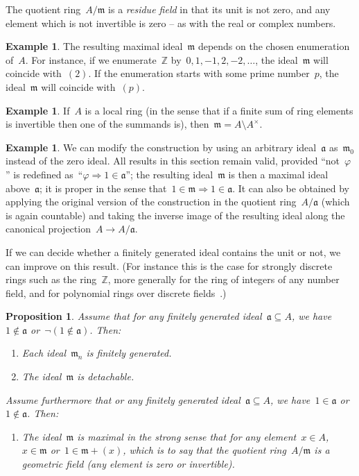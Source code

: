 \documentclass[oneside,reqno]{amsart}
\theoremstyle{definition}
\newtheorem{ex}[defn]{Example}
\theoremstyle{plain}
\newtheorem{prop}[defn]{Proposition}
\theoremstyle{remark}
\newcommand{\aaa}{\mathfrak{a}}
\newcommand{\mmm}{\mathfrak{m}}
\newcommand{\ZZ}{\mathbb{Z}}
\renewcommand{\_}{\mathpunct{.}\,}
\begin{document}
The quotient ring~$A/\mmm$ is a \emph{residue field} in that its unit is not
zero, and any element which is not invertible is zero -- as with the real or
complex numbers.

\begin{ex}The resulting maximal ideal~$\mmm$ depends on the chosen enumeration
of~$A$. For instance, if we enumerate~$\ZZ$ by~$0,1,-1,2,-2,\ldots$, the
ideal~$\mmm$ will coincide with~$(2)$. If the enumeration starts with some
prime number~$p$, the ideal~$\mmm$ will coincide with~$(p)$.\end{ex}

\begin{ex}If~$A$ is a local ring (in the sense that if a finite sum of ring
elements is invertible then one of the summands is), then~$\mmm = A \setminus
A^\times$.\end{ex}

\begin{ex}\label{ex:maximal-above}We can modify the construction by using an
arbitrary ideal~$\aaa$ as~$\mmm_0$ instead of the zero ideal. All results in
this section remain valid, provided ``not~$\varphi$'' is redefined
as~``$\varphi \Rightarrow 1\in\aaa$''; the resulting ideal~$\mmm$ is then a
maximal ideal above~$\aaa$; it is proper in the sense that~$1 \in \mmm
\Rightarrow 1 \in \aaa$. It can also be obtained by applying the original
version of the construction in the quotient ring~$A/\aaa$ (which is again
countable) and taking the inverse image of the resulting ideal along the
canonical projection~$A \to A/\aaa$.\end{ex}

If we can decide whether a finitely generated ideal contains the
unit or not, we can improve on this result. (For instance this is the case for
strongly discrete rings such as the ring~$\ZZ$, more generally for the ring of
integers of any number field, and for polynomial rings over discrete
fields~\cite[Theorem~VIII.1.5]{mines-richman-ruitenburg:constructive-algebra}.)

\begin{prop}\label{prop:with-test}
Assume that for any finitely generated ideal~$\aaa \subseteq A$, we have~$1
\not\in \aaa$ or~$\neg(1 \not\in \aaa)$. Then:
\begin{enumerate}
\item Each ideal~$\mmm_n$ is finitely generated.
\item The ideal~$\mmm$ is detachable.
\end{enumerate}
Assume furthermore that or any finitely generated ideal~$\aaa \subseteq
A$, we have~$1 \in \aaa$ or~$1 \not\in \aaa$. Then:
\begin{enumerate}
\addtocounter{enumi}{2}
\item The ideal~$\mmm$ is maximal in the strong sense that for any element~$x
\in A$,~$x \in \mmm$ or~$1 \in \mmm + (x)$, which is to say that the quotient ring~$A/\mmm$ is a
\emph{geometric field} (any element is zero or invertible).
\end{enumerate}
\end{prop}
\end{document}
